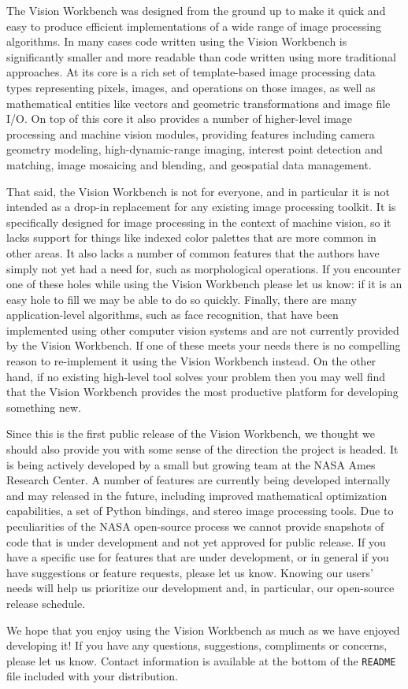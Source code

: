 The Vision Workbench was designed from the ground up to make it quick
and easy to produce efficient implementations of a wide range of image
processing algorithms.  In many cases code written using the Vision
Workbench is significantly smaller and more readable than code written
using more traditional approaches.  At its core is a rich set of
template-based image processing data types representing pixels,
images, and operations on those images, as well as mathematical
entities like vectors and geometric transformations and image file
I/O.  On top of this core it also provides a number of higher-level
image processing and machine vision modules, providing features
including camera geometry modeling, high-dynamic-range imaging,
interest point detection and matching, image mosaicing and blending,
and geospatial data management.

That said, the Vision Workbench is not for everyone, and in particular
it is not intended as a drop-in replacement for any existing image
processing toolkit.  It is specifically designed for image processing
in the context of machine vision, so it lacks support for things like
indexed color palettes that are more common in other areas.  It also
lacks a number of common features that the authors have simply not yet
had a need for, such as morphological operations.  If you encounter one
of these holes while using the Vision Workbench please let us know: if
it is an easy hole to fill we may be able to do so quickly.  Finally,
there are many application-level algorithms, such as face recognition,
that have been implemented using other computer vision systems and are
not currently provided by the Vision Workbench.  If one of these meets
your needs there is no compelling reason to re-implement it using the
Vision Workbench instead.  On the other hand, if no existing
high-level tool solves your problem then you may well find that the
Vision Workbench provides the most productive platform for developing
something new.

Since this is the first public release of the Vision Workbench, we
thought we should also provide you with some sense of the direction
the project is headed.  It is being actively developed by a small but
growing team at the NASA Ames Research Center.  A number of features
are currently being developed internally and may released in the
future, including improved mathematical optimization capabilities, a
set of Python bindings, and stereo image processing tools.  Due to
peculiarities of the NASA open-source process we cannot provide
snapshots of code that is under development and not yet approved for
public release.  If you have a specific use for features that are
under development, or in general if you have suggestions or feature
requests, please let us know.  Knowing our users' needs will help us
prioritize our development and, in particular, our open-source release
schedule.

We hope that you enjoy using the Vision Workbench as much as we have
enjoyed developing it!  If you have any questions, suggestions,
compliments or concerns, please let us know.  Contact information is
available at the bottom of the \verb#README# file included with your
distribution.

